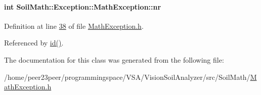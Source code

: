 \hypertarget{class_soil_math_1_1_exception_1_1_math_exception_aa9a6f85505030c25c55f2eb6e9f0aea1}{}
\paragraph[{nr}]{\setlength{\rightskip}{0pt plus 5cm}int Soil\+Math\+::\+Exception\+::\+Math\+Exception\+::nr\hspace{0.3cm}{\ttfamily [private]}}\label{class_soil_math_1_1_exception_1_1_math_exception_aa9a6f85505030c25c55f2eb6e9f0aea1}


Definition at line \hyperlink{_math_exception_8h_source_l00038}{38} of file \hyperlink{_math_exception_8h_source}{Math\+Exception.\+h}.



Referenced by \hyperlink{_math_exception_8h_source_l00034}{id()}.



The documentation for this class was generated from the following file\+:\begin{DoxyCompactItemize}
\item 
/home/peer23peer/programmingspace/\+V\+S\+A/\+Vision\+Soil\+Analyzer/src/\+Soil\+Math/\hyperlink{_math_exception_8h}{Math\+Exception.\+h}\end{DoxyCompactItemize}
